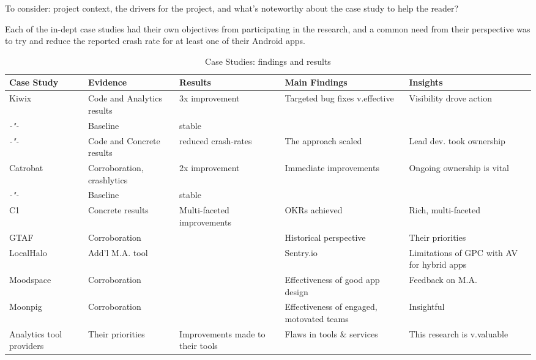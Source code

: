 To consider: project context, the drivers for the project, and what's noteworthy about the case study to help the reader?

Each of the in-dept case studies had their own objectives from participating in the research, and a common need from their perspective was to try and reduce the reported crash rate for at least one of their Android apps.

\begin{landscape} %
\begin{table}
    \centering
    \tabcolsep=0.06cm
    \tiny
    \begin{tabular}{lllll}\toprule
    Case Study                  &Evidence    &Results               &Main Findings             &Insights  \\
    \midrule
    Kiwix                       &Code and Analytics results &3x improvement        &Targeted bug fixes v.effective &Visibility drove action \\ 
     \textit{-"-}               &Baseline         &stable                &                     & \\
     \textit{-"-}               &Code and Concrete results &reduced crash-rates   &The approach scaled  &Lead dev. took ownership \\
     \midrule
    Catrobat                    &Corroboration, crashlytics &2x improvement     &Immediate improvements &Ongoing ownership is vital \\
     \textit{-"-}               &Baseline         &stable                &                     & \\
     \midrule
    C1                          &Concrete results &Multi-faceted improvements &OKRs achieved & Rich, multi-faceted \\
    GTAF                        &Corroboration    &                      &Historical perspective &Their priorities  \\
    LocalHalo                   &Add'l M.A. tool  &                      &Sentry.io &Limitations of GPC with AV for hybrid apps \\
    Moodspace                   &Corroboration    &                      &Effectiveness of good app design &Feedback on M.A. \\
    Moonpig                     &Corroboration    &                      &Effectiveness of engaged, motovated teams &Insightful \\
    Analytics tool providers    &Their priorities &Improvements made to their tools & Flaws in tools \& services &This research is v.valuable \\
    \bottomrule
    \end{tabular}
    \caption{Case Studies: findings and results}
    \label{tab:empirical-studies-findings-and-results}
\end{table}
\end{landscape}

